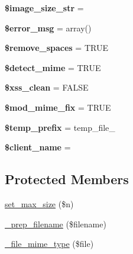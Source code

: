 \begin{DoxyCompactItemize}
\item 
\mbox{\label{class_c_i___upload_a3a1769072af8ab3b0c5d6e0c1a1ae2ef}} 
{\bfseries \$image\+\_\+size\+\_\+str} = \textquotesingle{}\textquotesingle{}
\item 
\mbox{\label{class_c_i___upload_acf910733622c1fa671b9f755c69c2ec7}} 
{\bfseries \$error\+\_\+msg} = array()
\item 
\mbox{\label{class_c_i___upload_ad9f32a52b4b2c16e42a007e0fa832721}} 
{\bfseries \$remove\+\_\+spaces} = T\+R\+UE
\item 
\mbox{\label{class_c_i___upload_a50f6c723a0c96d773ecff982e7117a5f}} 
{\bfseries \$detect\+\_\+mime} = T\+R\+UE
\item 
\mbox{\label{class_c_i___upload_a0f2ee8861c0b3164a5c6e126dd98c0cc}} 
{\bfseries \$xss\+\_\+clean} = F\+A\+L\+SE
\item 
\mbox{\label{class_c_i___upload_a5f54983a6ad24a5ee5c4ff5d9de48d83}} 
{\bfseries \$mod\+\_\+mime\+\_\+fix} = T\+R\+UE
\item 
\mbox{\label{class_c_i___upload_ab38888cba65ae75bbc5b3841bc69d64a}} 
{\bfseries \$temp\+\_\+prefix} = \textquotesingle{}temp\+\_\+file\+\_\+\textquotesingle{}
\item 
\mbox{\label{class_c_i___upload_a3b81ba4d3535269e20e0b4a2ddab2edc}} 
{\bfseries \$client\+\_\+name} = \textquotesingle{}\textquotesingle{}
\end{DoxyCompactItemize}
\subsection*{Protected Members}
\begin{DoxyCompactItemize}
\item 
\mbox{\hyperlink{class_c_i___upload_ac6e7445ece6780c730e910d978dde95e}{set\+\_\+max\+\_\+size}} (\$n)
\item 
\mbox{\hyperlink{class_c_i___upload_a00936ce870d818794909bf16dc2ff70b}{\+\_\+prep\+\_\+filename}} (\$filename)
\item 
\mbox{\hyperlink{class_c_i___upload_a8ac4511eca70b271965b7f8ef00faf66}{\+\_\+file\+\_\+mime\+\_\+type}} (\$file)
\end{DoxyCompactItemize}
